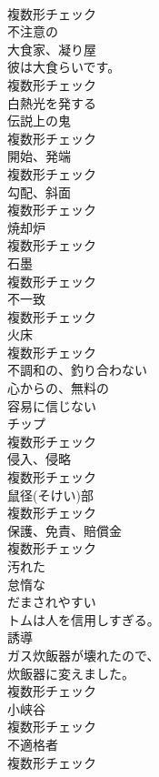 \documentclass[8pt]{extreport}
\begin{document}
\begin{CJK}{UTF8}{min}
\\	複数形チェック
\\	[形容詞]	不注意の	
\\	[名詞]	大食家、凝り屋	
\\	彼は大食らいです。	
\\	複数形チェック
\\	[形容詞]	白熱光を発する	
\\	[名詞]	伝説上の⻤	
\\	複数形チェック
\\	[名詞]	開始、発端	
\\	複数形チェック
\\	[名詞]	勾配、斜面	
\\	複数形チェック
\\	[名詞]	焼却炉	
\\	複数形チェック
\\	[名詞]	石墨	
\\	複数形チェック
\\	[名詞]	不一致	
\\	複数形チェック
\\	[名詞]	火床	
\\	複数形チェック
\\	[形容詞]	不調和の、釣り合わない	
\\	[形容詞]	心からの、無料の	
\\	[形容詞]	容易に信じない	
\\	[名詞]	チップ	
\\	複数形チェック
\\	[名詞]	侵入、侵略	
\\	複数形チェック
\\	[名詞]	鼠径(そけい)部	
\\	複数形チェック
\\	[名詞]	保護、免責、賠償金	
\\	複数形チェック
\\	[形容詞]	汚れた	
\\	[形容詞]	怠惰な	
\\	[形容詞]	だまされやすい	
\\	トムは人を信用しすぎる。	
\\	[名詞]	誘導	
\\	ガス炊飯器が壊れたので、
\\	炊飯器に変えました。	
\\	複数形チェック
\\	[名詞]	小峡谷	
\\	複数形チェック
\\	[名詞]	不適格者	
\\	複数形チェック

\end{CJK}
\end{document}
